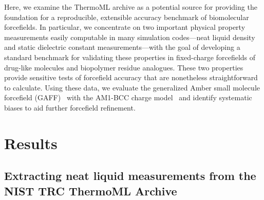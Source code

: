 \documentclass[aps,pre,twocolumn,nofootinbib,superscriptaddress,linenumbers]{revtex4-1}
\begin{document}
Here, we examine the ThermoML archive as a potential source for providing the foundation for a reproducible, extensible accuracy benchmark of biomolecular forcefields.
In particular, we concentrate on two important physical property measurements easily computable in many simulation codes---neat liquid density and static dielectric constant measurements---with the goal of developing a standard benchmark for validating these properties in fixed-charge forcefields of drug-like molecules and biopolymer residue analogues.  
These two properties provide sensitive tests of forcefield accuracy that are nonetheless straightforward to calculate.  
Using these data, we evaluate the generalized Amber small molecule forcefield (GAFF)~\cite{gaff} with the AM1-BCC charge model~\cite{am1bcc1,am1bcc2} and identify systematic biases to aid further forcefield refinement.


\section{Results}

\subsection{Extracting neat liquid measurements from the NIST TRC ThermoML Archive}
\label{section:filtering-thermoml}
\end{document}
